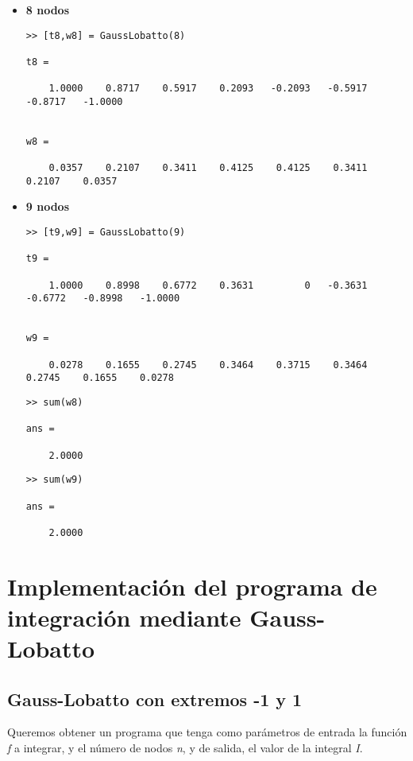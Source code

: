 \documentclass[a4paper]{article}
\begin{document}
\begin{itemize}
\item \textbf{8 nodos}
\begin{lstlisting}[frame=single, style=Matlab-Pyglike]
>> [t8,w8] = GaussLobatto(8)

t8 =

    1.0000    0.8717    0.5917    0.2093   -0.2093   -0.5917   -0.8717   -1.0000


w8 =

    0.0357    0.2107    0.3411    0.4125    0.4125    0.3411    0.2107    0.0357
\end{lstlisting}

\item \textbf{9 nodos}
\begin{lstlisting}[frame=single, style=Matlab-Pyglike]
>> [t9,w9] = GaussLobatto(9)

t9 =

    1.0000    0.8998    0.6772    0.3631         0   -0.3631   -0.6772   -0.8998   -1.0000


w9 =

    0.0278    0.1655    0.2745    0.3464    0.3715    0.3464    0.2745    0.1655    0.0278
\end{lstlisting}

\begin{lstlisting}[frame=single, style=Matlab-Pyglike]
>> sum(w8)

ans =

    2.0000
\end{lstlisting}
\begin{lstlisting}[frame=single, style=Matlab-Pyglike]
>> sum(w9)

ans =

    2.0000
\end{lstlisting}

\end{itemize}
\section{Implementación del programa de integración mediante Gauss-Lobatto}

\subsection{Gauss-Lobatto con extremos -1 y 1}
Queremos obtener un programa que tenga como parámetros de entrada la función \textit{f} a integrar, y el número de nodos \textit{n}, y de salida, el valor de la integral \textit{I}.
\end{document}
